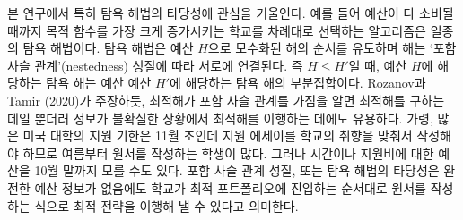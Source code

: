 \documentclass[12pt]{article} %
\newif\ifen
\theoremstyle{definition}
\theoremstyle{definition}
\begin{document}
\ifen
We take special interest in the validity of greedy solution algorithms, such as that that iteratively adds the asset that yields the greatest increase in the objective function until the budget is exhausted. Greedy algorithms produce a \emph{nested} family of solutions, parameterized by the budget $H$: If $H \leq H'$, then the greedy solution for budget $H$ is a subset of the greedy solution for budget $H'$. As Rozanov and Tamir (2020) remark, the knowledge that the optima are nested aids not only in computing the optimal solution, but in the implementation thereof under uncertain information. For example, in the United States, many college applications are due at the beginning of November, and it is typical for students to begin working on their applications during the prior summer because colleges expect students to tailor their essays to the target school. However, students may not know how many schools they can afford to apply to until late October. The nestedness property---or equivalently, the validity of a greedy algorithm---implies that even in the absence of complete budget information, students can begin to carry out the optimal application strategy by writing essays for schools in the order that they enter the maximal portfolio.
\else
본 연구에서 특히 탐욕 해법의 타당성에 관심을 기울인다. 예를 들어 예산이 다 소비될 때까지 목적 함수를 가장 크게 증가시키는 학교를 차례대로 선택하는 알고리즘은 일종의 탐욕 해법이다. 탐욕 해법은 예산 $H$으로 모수화된 해의 순서를 유도하며 해는 `포함 사슬 관계'(nestedness) 성질에 따라 서로에 연결된다. 즉 $H \leq H'$일 때, 예산 $H$에 해당하는 탐욕 해는 예산 예산 $H'$에 해당하는 탐욕 해의 부분집합이다. Rozanov과 Tamir (2020)가 주장하듯, 최적해가 포함 사슬 관계를 가짐을 알면 최적해를 구하는 데일 뿐더러 정보가 불확실한 상황에서 최적해를 이행하는 데에도 유용하다. 가령, 많은 미국 대학의 지원 기한은 11월 초인데 지원 에세이를 학교의 취향을 맞춰서 작성해야 하므로 여름부터 원서를 작성하는 학생이 많다. 그러나 시간이나 지원비에 대한 예산을 10월 말까지 모를 수도 있다. 포함 사슬 관계 성질, 또는 탐욕 해법의 타당성은 완전한 예산 정보가 없음에도 학교가 최적 포트폴리오에 진입하는 순서대로 원서를 작성하는 식으로 최적 전략을 이행해 낼 수 있다고 의미한다.
\fi
\end{document}
